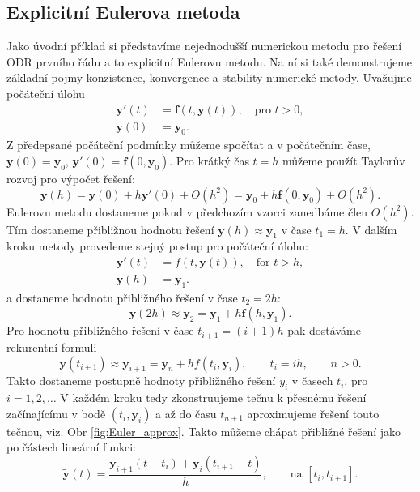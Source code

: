 \documentclass[a4paper, 12pt]{book}
\theoremstyle{definition}
\def\vc#1{\mathbf{\boldsymbol{#1}}}     %
\begin{document}
\subsection{Explicitní Eulerova metoda}
Jako úvodní příklad si představíme nejednodušší numerickou metodu pro řešení ODR prvního řádu a
to explicitní Eulerovu metodu. Na ní si také demonstrujeme základní pojmy konzistence, konvergence a stability numerické metody.
Uvažujme počáteční úlohu
\begin{align*}    
   \vc y'(t) &= \vc f(t,\vc y(t)), \quad \text{pro }t>0,\\
   \vc y(0)&=\vc y_0.
\end{align*}
Z předepsané počáteční podmínky můžeme spočítat  a  v počátečním čase, $\vc y(0) = \vc y_0$, $\vc y'(0) = \vc f(0, \vc y_0)$. 
Pro krátký čas $t=h$ můžeme použít Taylorův rozvoj pro výpočet řešení:
\[
  \vc y(h) = \vc y(0) + h \vc y'(0) + O(h^2) = \vc y_0 + h \vc f(0, \vc y_0) + O(h^2).
\]
Eulerovu metodu dostaneme pokud v předchozím vzorci zanedbáme člen $O(h^2)$. Tím dostaneme přibližnou hodnotu řešení $\vc y(h) \approx \vc y_1$
v čase $t_1=h$. V dalším kroku metody provedeme stejný postup pro počáteční úlohu:
\begin{align*}
   \vc y'(t) &= f(t, \vc y(t)), \quad \text{for }t>h,\\
   \vc y(h)&=\vc y_1.
\end{align*}
a dostaneme hodnotu přibližného řešení v čase $t_2=2h$:
\[
   \vc y(2h) \approx \vc y_2 = \vc y_1 + h \vc f(h, \vc y_1).
\]
Pro hodnotu přibližného řešení v čase $t_{i+1}=(i+1)h$ pak dostáváme rekurentní formuli
\begin{equation}
   \label{eq:Euler_method}
   \vc y(t_{i+1}) \approx \vc y_{i+1} = \vc y_n + h f(t_i, \vc y_i),\qquad t_i=ih,\qquad n>0.
\end{equation}
Takto dostaneme postupně hodnoty přibližného řešení $y_i$ v časech $t_i$, pro $i=1,2,\dots$
V každém kroku tedy zkonstruujeme tečnu k přesnému řešení začínajícímu v bodě $(t_i, \vc y_i)$
a až do času $t_{n+1}$ aproximujeme řešení touto tečnou, viz. Obr \ref{fig:Euler_approx}.
Takto můžeme chápat přibližné řešení jako po částech lineární funkci:
\[
   \vc{\tilde y}(t) = \frac{\vc y_{i+1}(t - t_i) + \vc y_i(t_{i+1}-t)}{h},\qquad \text{na } [t_i, t_{i+1}].
\]
\pagebreak
\end{document}
